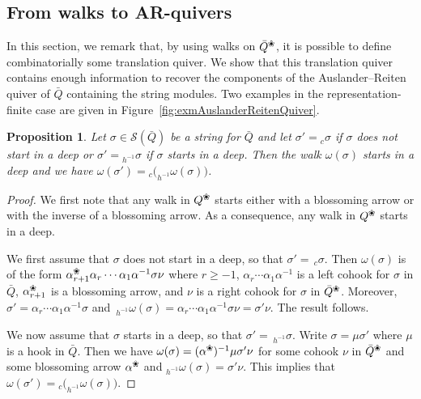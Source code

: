 \documentclass{amsart}
\newtheorem{proposition}[theorem]{Proposition}
\theoremstyle{definition}
\newcommand{\blossom}{^\text{\ding{96}}} %
\newcommand{\strings}{\mathcal{S}} %
\begin{document}
\subsection{From walks to AR-quivers}

In this section, we remark that, by using walks on $\bar Q\blossom$, it is possible to define combinatorially some translation quiver.
We show that this translation quiver contains enough information to recover the components of the Auslander--Reiten quiver of $\bar Q$ containing the string modules.
Two examples in the representation-finite case are given in Figure~\ref{fig:exmAuslanderReitenQuiver}.

\begin{proposition}\label{proposition: elementary moves and walks}
Let $\sigma\in\strings(\bar Q)$ be a string for $\bar Q$ and let $\sigma' = {}_c\sigma$ if $\sigma$ does not start in a deep or $\sigma' = {}_{h^{-1}}\sigma$ if $\sigma$ starts in a deep.
Then the walk $\omega(\sigma)$ starts in a deep and we have $\omega(\sigma') = {}_c\big(_{h^{-1}}\omega(\sigma)\big)$.
\end{proposition}

\begin{proof}
We first note that any walk in $Q\blossom$ starts either with a blossoming arrow or with the inverse of a blossoming arrow.
As a consequence, any walk in $Q\blossom$ starts in a deep.

We first assume that $\sigma$ does not start in a deep, so that $\sigma'=\,_c\sigma$.
Then $\omega(\sigma)$ is of the form $\alpha_{r+1} \blossom \alpha_r \cdots \alpha_1 \alpha^{-1}\sigma\nu$ where $r\geq -1$, $\alpha_r\cdots\alpha_1\alpha^{-1}$ is a left cohook for $\sigma$ in $\bar Q$, $\alpha_{r+1}\blossom$ is a blossoming arrow, and $\nu$ is a right cohook for $\sigma$ in $\bar Q\blossom$.
Moreover, $\sigma'=\alpha_r\cdots\alpha_1\alpha^{-1}\sigma$ and $\,_{h^{-1}}\omega(\sigma) = \alpha_r\cdots\alpha_1\alpha^{-1}\sigma\nu = \sigma'\nu$.
The result follows.

We now assume that $\sigma$ starts in a deep, so that $\sigma'=\,_{h^{-1}}\sigma$.
Write $\sigma = \mu\sigma'$ where $\mu$ is a hook in $\bar Q$.
Then we have $\omega(\sigma)=(\alpha\blossom)^{-1}\mu\sigma'\nu$ for some cohook $\nu$ in $\bar Q\blossom$ and some blossoming arrow $\alpha\blossom$ and $_{h^{-1}}\omega(\sigma)=\sigma'\nu$.
This implies that $\omega(\sigma') = {}_c\big(_{h^{-1}}\omega(\sigma)\big)$.
\end{proof}
\end{document}
